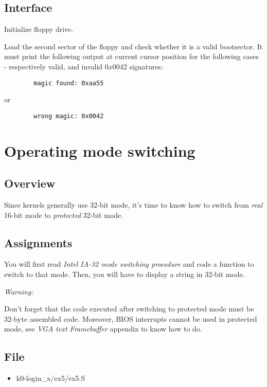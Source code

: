 \subsection*{Interface}
{
  Initialize floppy drive.
}

{
  Load the second sector of the floppy and check whether it is a valid
  bootsector. It must print the following output at current cursor
  position for the following cases - respectively valid, and invalid $0x0042$
  signatures:
}
\begin{verbatim}
        magic found: 0xaa55
\end{verbatim}
\function{}{} {
or
}
\begin{verbatim}
        wrong magic: 0x0042
\end{verbatim}


%
%

\newpage

\section{Operating mode switching}

\subsection*{Overview}
Since kernels generally use 32-bit mode, it's time to know how to switch from
\emph{real} 16-bit mode to \emph{protected} 32-bit mode.

\subsection*{Assignments}
You will first read \emph{Intel IA-32 mode switching procedure} and code a
function to switch to that mode. Then, you will have to display a string in
32-bit mode.

{\em Warning:}

Don't forget that the code executed after switching to protected mode must be
32-byte assembled code. Moreover, BIOS interrupts cannot be used in protected
mode, see \emph{VGA text Framebuffer} appendix to know how to do.

\subsection*{File}
\begin{itemize}
  \item k0-login\_x/ex5/ex5.S
\end{itemize}

